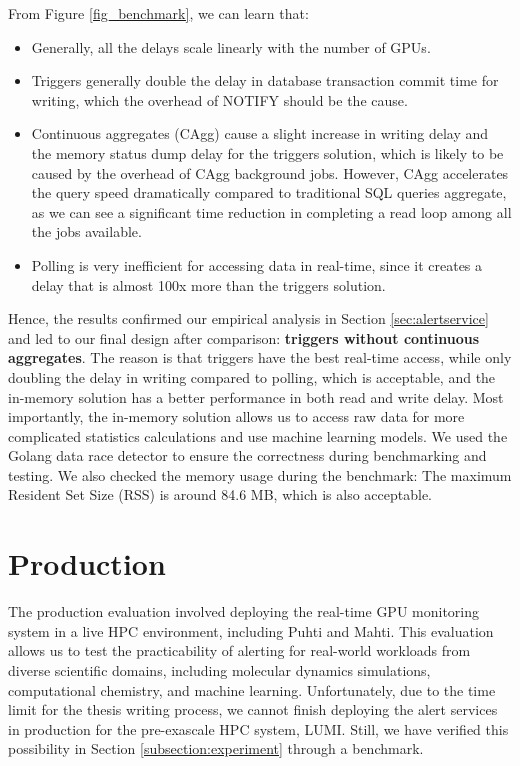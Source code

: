From Figure \ref{fig_benchmark}, we can learn that:

\begin{itemize}
    \item Generally, all the delays scale linearly with the number of GPUs.
    \item Triggers generally double the delay in database transaction commit time for writing, which the overhead of NOTIFY should be the cause.
    \item Continuous aggregates (CAgg) cause a slight increase in writing delay and the memory status dump delay for the triggers solution, which is likely to be caused by the overhead of CAgg background jobs. However, CAgg accelerates the query speed dramatically compared to traditional SQL queries aggregate, as we can see a significant time reduction in completing a read loop among all the jobs available.
    \item Polling is very inefficient for accessing data in real-time, since it creates a delay that is almost 100x more than the triggers solution.
\end{itemize}

Hence, the results confirmed our empirical analysis in Section \ref{sec:alertservice} and led to our final design after comparison: \textbf{triggers without continuous aggregates}. The reason is that triggers have the best real-time access, while only doubling the delay in writing compared to polling, which is acceptable, and the in-memory solution has a better performance in both read and write delay. Most importantly, the in-memory solution allows us to access raw data for more complicated statistics calculations and use machine learning models. We used the Golang data race detector to ensure the correctness during benchmarking and testing. We also checked the memory usage during the benchmark: The maximum Resident Set Size (RSS) is around 84.6 MB, which is also acceptable.


\section{Production}

The production evaluation involved deploying the real-time GPU monitoring system in a live HPC environment, including Puhti and Mahti. This evaluation allows us to test the practicability of alerting for real-world workloads from diverse scientific domains, including molecular dynamics simulations, computational chemistry, and machine learning. Unfortunately, due to the time limit for the thesis writing process, we cannot finish deploying the alert services in production for the pre-exascale HPC system, LUMI. Still, we have verified this possibility in Section \ref{subsection:experiment} through a benchmark.

